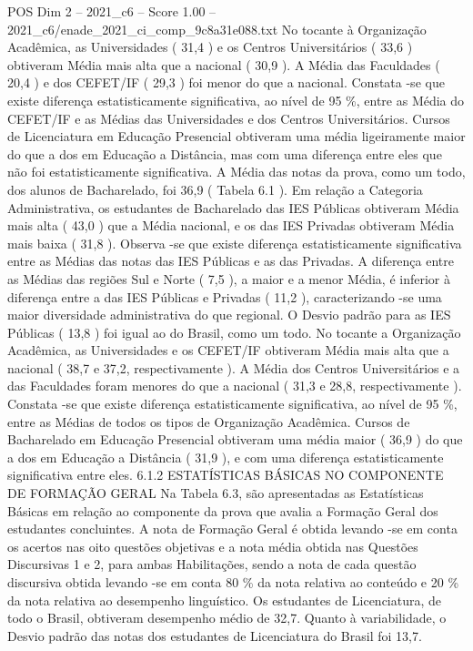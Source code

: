 \begin{textsample}{POS Dim 2 – 2021\_c6 – Score 1.00 – 2021\_c6/enade\_2021\_ci\_comp\_9c8a31e088.txt}
No tocante à Organização Acadêmica, as Universidades ( 31,4 ) e os Centros Universitários ( 33,6 ) obtiveram Média mais alta que a nacional ( 30,9 ).
A Média das Faculdades ( 20,4 ) e dos CEFET/IF ( 29,3 ) foi menor do que a nacional.
Constata -se que existe diferença estatisticamente significativa, ao nível de 95 \%, entre as Média do CEFET/IF e as Médias das Universidades e dos Centros Universitários.
Cursos de Licenciatura em Educação Presencial obtiveram uma média ligeiramente maior do que a dos em Educação a Distância, mas com uma diferença entre eles que não foi estatisticamente significativa.
A Média das notas da prova, como um todo, dos alunos de Bacharelado, foi 36,9 ( Tabela 6.1 ).
Em relação a Categoria Administrativa, os estudantes de Bacharelado das IES Públicas obtiveram Média mais alta ( 43,0 ) que a Média nacional, e os das IES Privadas obtiveram Média mais baixa ( 31,8 ).
Observa -se que existe diferença estatisticamente significativa entre as Médias das notas das IES Públicas e as das Privadas.
A diferença entre as Médias das regiões Sul e Norte ( 7,5 ), a maior e a menor Média, é inferior à diferença entre a das IES Públicas e Privadas ( 11,2 ), caracterizando -se uma maior diversidade administrativa do que regional.
O Desvio padrão para as IES Públicas ( 13,8 ) foi igual ao do Brasil, como um todo.
No tocante a Organização Acadêmica, as Universidades e os CEFET/IF obtiveram Média mais alta que a nacional ( 38,7 e 37,2, respectivamente ).
A Média dos Centros Universitários e a das Faculdades foram menores do que a nacional ( 31,3 e 28,8, respectivamente ).
Constata -se que existe diferença estatisticamente significativa, ao nível de 95 \%, entre as Médias de todos os tipos de Organização Acadêmica.
Cursos de Bacharelado em Educação Presencial obtiveram uma média maior ( 36,9 ) do que a dos em Educação a Distância ( 31,9 ), e com uma diferença estatisticamente significativa entre eles. 6.1.2 ESTATÍSTICAS BÁSICAS NO COMPONENTE DE FORMAÇÃO GERAL Na Tabela 6.3, são apresentadas as Estatísticas Básicas em relação ao componente da prova que avalia a Formação Geral dos estudantes concluintes.
A nota de Formação Geral é obtida levando -se em conta os acertos nas oito questões objetivas e a nota média obtida nas Questões Discursivas 1 e 2, para ambas Habilitações, sendo a nota de cada questão discursiva obtida levando -se em conta 80 \% da nota relativa ao conteúdo e 20 \% da nota relativa ao desempenho linguístico.
Os estudantes de Licenciatura, de todo o Brasil, obtiveram desempenho médio de 32,7.
Quanto à variabilidade, o Desvio padrão das notas dos estudantes de Licenciatura do Brasil foi 13,7.

\end{textsample}
